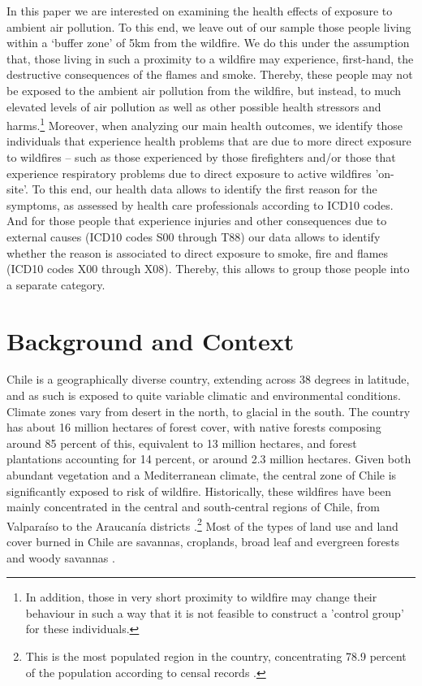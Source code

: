 \documentclass[11pt]{article}
\begin{document}
\begin{spacing}{1.3}
In this paper we are interested on examining the health effects of exposure to ambient air pollution. To this end, we leave out of our sample those people living within a `buffer zone' of 5km from the wildfire. We do this under the assumption that, those living in such a proximity to a wildfire may experience, first-hand, the destructive consequences of the flames and smoke. Thereby, these people may not be exposed to the ambient air pollution from the wildfire, but instead, to much elevated levels of air pollution as well as other possible health stressors and harms.\footnote{In addition, those in very short proximity to wildfire may change their behaviour in such a way that it is not feasible to  construct a 'control group' for these individuals.} Moreover, when analyzing our main health outcomes, we identify those individuals that experience health problems that are due to more direct exposure to wildfires -- such as those experienced by those firefighters and/or those that experience respiratory problems due to direct exposure to active wildfires 'on-site'. To this end, our health data allows to identify the first reason for the symptoms, as assessed by health care professionals according to ICD10 codes. And for those people that experience injuries and other consequences due to external causes (ICD10 codes S00 through T88) our data allows to identify whether the reason is associated to direct exposure to smoke, fire and flames (ICD10 codes X00 through X08). Thereby, this allows to group those people into a separate category.


\section{Background and Context}
Chile is a geographically diverse country, extending across 38 degrees in latitude, and as such is exposed to quite variable climatic and environmental conditions.  Climate zones vary from desert in the north, to glacial in the south. The country has about 16 million hectares of forest cover, with native forests composing around 85 percent of this, equivalent to 13 million hectares, and forest plantations accounting for 14 percent, or around 2.3 million hectares. %
Given both abundant vegetation and a Mediterranean climate, the central zone of Chile is significantly exposed to risk of wildfire.  Historically, these wildfires have been mainly concentrated in the central and south-central regions of Chile, from Valparaíso to the Araucanía districts \citep{sarricolea2020recent}.\footnote{This is the most populated region in the country, concentrating 78.9 percent of the population according to censal records \citep{INE2018}.} Most of the types of land use and land cover burned in Chile are savannas, croplands, broad leaf and evergreen forests and woody savannas \citep{sarricolea2020recent}. 


\end{spacing}
\end{document}
